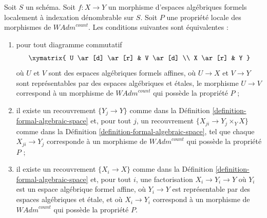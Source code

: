 \begin{lemma}
\label{lemma-property-defines-property-morphisms}
Soit $S$ un schéma. Soit $f : X \to Y$ un morphisme d'espaces algébriques formels
localement à indexation dénombrable sur $S$.
Soit $P$ une propriété locale des morphismes de $\textit{WAdm}^{count}$.
Les conditions suivantes sont équivalentes :
\begin{enumerate}
\item pour tout diagramme commutatif
$$
\xymatrix{
U \ar[d] \ar[r] & V \ar[d] \\
X \ar[r] & Y
}
$$
où $U$ et $V$ sont des espaces algébriques formels affines, où $U \to X$ et $V \to Y$
sont représentables par des espaces algébriques et étales, le morphisme $U \to V$
correspond à un morphisme de $\textit{WAdm}^{count}$ qui possède la propriété $P$ ;
\item il existe un recouvrement $\{Y_j \to Y\}$ comme dans la
Définition \ref{definition-formal-algebraic-space} et, pour tout $j$,
un recouvrement $\{X_{ji} \to Y_j \times_Y X\}$ comme dans la
Définition \ref{definition-formal-algebraic-space},
tel que chaque $X_{ji} \to Y_j$ corresponde
à un morphisme de $\textit{WAdm}^{count}$ qui possède la propriété $P$ ;
\item il existe un recouvrement $\{X_i \to X\}$ comme dans la
Définition \ref{definition-formal-algebraic-space}
et, pour tout $i$, une factorisation $X_i \to Y_i \to Y$ où $Y_i$
est un espace algébrique formel affine, où $Y_i \to Y$ est représentable
par des espaces algébriques et étale, et où $X_i \to Y_i$ correspond
à un morphisme de $\textit{WAdm}^{count}$ qui possède la propriété $P$.
\end{enumerate}
\end{lemma}

